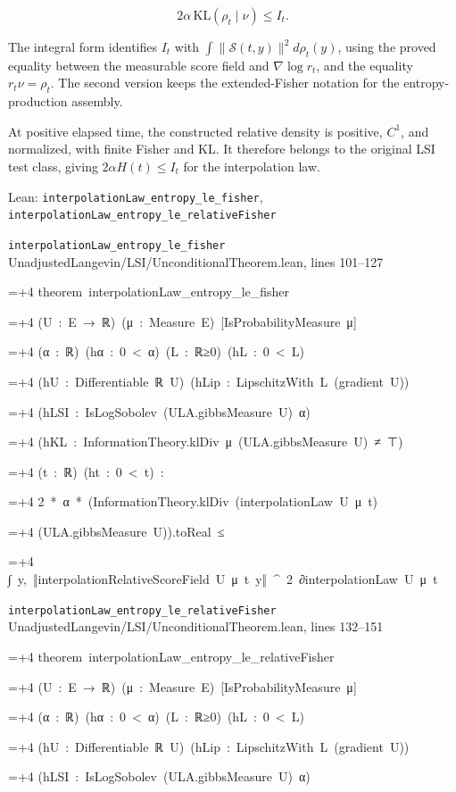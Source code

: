 \documentclass[11pt,a4paper]{report}
\newlength{\leancharwidth}
\newenvironment{leancode}{\par\smallskip\begingroup\ttfamily\footnotesize\raggedright
  \settowidth{\leancharwidth}{M}\setlength{\parskip}{0pt}\setlength{\parindent}{0pt}
  \frenchspacing}{\par\endgroup\smallskip}
\newcommand{\leanline}[2]{\hangindent=\dimexpr#1\leancharwidth+4\leancharwidth\relax
  \hangafter=1\noindent\hspace*{#1\leancharwidth}#2\par}
\newcommand{\leansource}[1]{\par{\footnotesize\color{leanmuted}#1}\par}
\begin{document}
\[2\alpha\,\mathrm{KL}(\rho_t\mid\nu)\le I_t.\]

The integral form identifies \(I_t\) with \(\int\|\mathcal S(t,y)\|^2d\rho_t(y)\), using the proved equality between the measurable score field and \(\nabla\log r_t\), and the equality \(r_t\nu=\rho_t\). The second version keeps the extended-Fisher notation for the entropy-production assembly.



At positive elapsed time, the constructed relative density is positive, \(C^1\), and normalized, with finite Fisher and KL. It therefore belongs to the original LSI test class, giving \(2\alpha H(t)\le I_t\) for the interpolation law.

\begin{leanbox}{Lean: \texttt{interpolationLaw\_\allowbreak{}entropy\_\allowbreak{}le\_\allowbreak{}fisher}, \texttt{interpolationLaw\_\allowbreak{}entropy\_\allowbreak{}le\_\allowbreak{}relativeFisher}}
\leansource{\texttt{interpolationLaw\_\allowbreak{}entropy\_\allowbreak{}le\_\allowbreak{}fisher} \quad UnadjustedLangevin/\allowbreak{}LSI/\allowbreak{}UnconditionalTheorem.lean, lines 101–127}
\begin{leancode}
\leanline{0}{theorem\ interpolationLaw\_entropy\_le\_fisher}
\leanline{4}{(U\ :\ E\ →\ ℝ)\ (μ\ :\ Measure\ E)\ [IsProbabilityMeasure\ μ]}
\leanline{4}{(α\ :\ ℝ)\ (hα\ :\ 0\ <\ α)\ (L\ :\ ℝ≥0)\ (hL\ :\ 0\ <\ L)}
\leanline{4}{(hU\ :\ Differentiable\ ℝ\ U)\ (hLip\ :\ LipschitzWith\ L\ (gradient\ U))}
\leanline{4}{(hLSI\ :\ IsLogSobolev\ (ULA.gibbsMeasure\ U)\ α)}
\leanline{4}{(hKL\ :\ InformationTheory.klDiv\ μ\ (ULA.gibbsMeasure\ U)\ ≠\ ⊤)}
\leanline{4}{(t\ :\ ℝ)\ (ht\ :\ 0\ <\ t)\ :}
\leanline{4}{2\ *\ α\ *\ (InformationTheory.klDiv\ (interpolationLaw\ U\ μ\ t)}
\leanline{6}{(ULA.gibbsMeasure\ U)).toReal\ ≤}
\leanline{8}{∫\ y,\ ‖interpolationRelativeScoreField\ U\ μ\ t\ y‖\ \textasciicircum{}\ 2\ ∂interpolationLaw\ U\ μ\ t}
\end{leancode}
\leansource{\texttt{interpolationLaw\_\allowbreak{}entropy\_\allowbreak{}le\_\allowbreak{}relativeFisher} \quad UnadjustedLangevin/\allowbreak{}LSI/\allowbreak{}UnconditionalTheorem.lean, lines 132–151}
\begin{leancode}
\leanline{0}{theorem\ interpolationLaw\_entropy\_le\_relativeFisher}
\leanline{4}{(U\ :\ E\ →\ ℝ)\ (μ\ :\ Measure\ E)\ [IsProbabilityMeasure\ μ]}
\leanline{4}{(α\ :\ ℝ)\ (hα\ :\ 0\ <\ α)\ (L\ :\ ℝ≥0)\ (hL\ :\ 0\ <\ L)}
\leanline{4}{(hU\ :\ Differentiable\ ℝ\ U)\ (hLip\ :\ LipschitzWith\ L\ (gradient\ U))}
\leanline{4}{(hLSI\ :\ IsLogSobolev\ (ULA.gibbsMeasure\ U)\ α)}

\end{leancode}
\end{leanbox}
\end{document}
